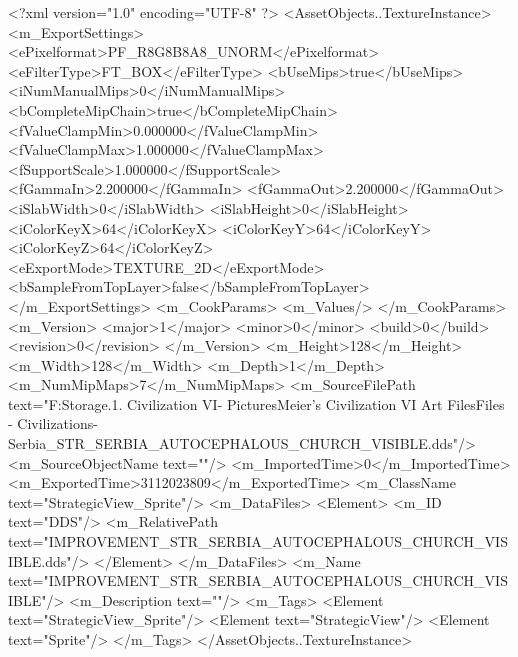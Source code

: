 <?xml version="1.0" encoding="UTF-8" ?>
<AssetObjects..TextureInstance>
	<m_ExportSettings>
		<ePixelformat>PF_R8G8B8A8_UNORM</ePixelformat>
		<eFilterType>FT_BOX</eFilterType>
		<bUseMips>true</bUseMips>
		<iNumManualMips>0</iNumManualMips>
		<bCompleteMipChain>true</bCompleteMipChain>
		<fValueClampMin>0.000000</fValueClampMin>
		<fValueClampMax>1.000000</fValueClampMax>
		<fSupportScale>1.000000</fSupportScale>
		<fGammaIn>2.200000</fGammaIn>
		<fGammaOut>2.200000</fGammaOut>
		<iSlabWidth>0</iSlabWidth>
		<iSlabHeight>0</iSlabHeight>
		<iColorKeyX>64</iColorKeyX>
		<iColorKeyY>64</iColorKeyY>
		<iColorKeyZ>64</iColorKeyZ>
		<eExportMode>TEXTURE_2D</eExportMode>
		<bSampleFromTopLayer>false</bSampleFromTopLayer>
	</m_ExportSettings>
	<m_CookParams>
		<m_Values/>
	</m_CookParams>
	<m_Version>
		<major>1</major>
		<minor>0</minor>
		<build>0</build>
		<revision>0</revision>
	</m_Version>
	<m_Height>128</m_Height>
	<m_Width>128</m_Width>
	<m_Depth>1</m_Depth>
	<m_NumMipMaps>7</m_NumMipMaps>
	<m_SourceFilePath text="F:\Mod Storage\2.1. Civilization VI\Mods\Archive - Pictures\Sid Meier's Civilization VI Art Files\Art Files - Civilizations\Civilization - Serbia\IMPROVEMENT_STR_SERBIA_AUTOCEPHALOUS_CHURCH_VISIBLE.dds"/>
	<m_SourceObjectName text=""/>
	<m_ImportedTime>0</m_ImportedTime>
	<m_ExportedTime>3112023809</m_ExportedTime>
	<m_ClassName text="StrategicView_Sprite"/>
	<m_DataFiles>
		<Element>
			<m_ID text="DDS"/>
			<m_RelativePath text="IMPROVEMENT_STR_SERBIA_AUTOCEPHALOUS_CHURCH_VISIBLE.dds"/>
		</Element>
	</m_DataFiles>
	<m_Name text="IMPROVEMENT_STR_SERBIA_AUTOCEPHALOUS_CHURCH_VISIBLE"/>
	<m_Description text=""/>
	<m_Tags>
		<Element text="StrategicView_Sprite"/>
		<Element text="StrategicView"/>
		<Element text="Sprite"/>
	</m_Tags>
</AssetObjects..TextureInstance>

